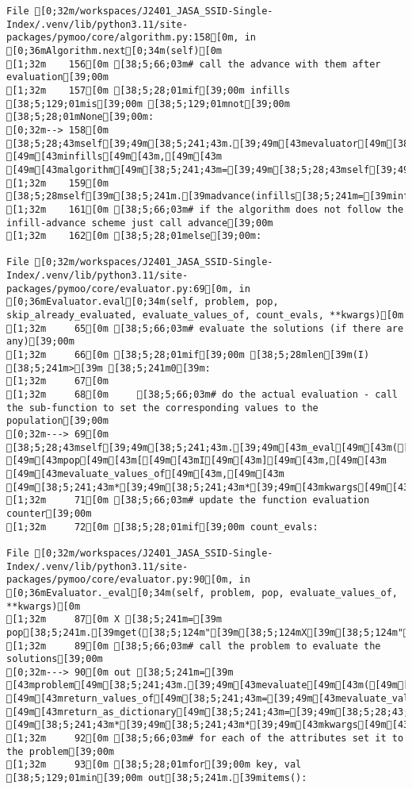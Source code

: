 \documentclass[
  letterpaper,
  DIV=11,
  numbers=noendperiod]{scrartcl}
\begin{document}
\begin{verbatim}
File [0;32m/workspaces/J2401_JASA_SSID-Single-Index/.venv/lib/python3.11/site-packages/pymoo/core/algorithm.py:158[0m, in [0;36mAlgorithm.next[0;34m(self)[0m
[1;32m    156[0m [38;5;66;03m# call the advance with them after evaluation[39;00m
[1;32m    157[0m [38;5;28;01mif[39;00m infills [38;5;129;01mis[39;00m [38;5;129;01mnot[39;00m [38;5;28;01mNone[39;00m:
[0;32m--> 158[0m     [38;5;28;43mself[39;49m[38;5;241;43m.[39;49m[43mevaluator[49m[38;5;241;43m.[39;49m[43meval[49m[43m([49m[38;5;28;43mself[39;49m[38;5;241;43m.[39;49m[43mproblem[49m[43m,[49m[43m [49m[43minfills[49m[43m,[49m[43m [49m[43malgorithm[49m[38;5;241;43m=[39;49m[38;5;28;43mself[39;49m[43m)[49m
[1;32m    159[0m     [38;5;28mself[39m[38;5;241m.[39madvance(infills[38;5;241m=[39minfills)
[1;32m    161[0m [38;5;66;03m# if the algorithm does not follow the infill-advance scheme just call advance[39;00m
[1;32m    162[0m [38;5;28;01melse[39;00m:

File [0;32m/workspaces/J2401_JASA_SSID-Single-Index/.venv/lib/python3.11/site-packages/pymoo/core/evaluator.py:69[0m, in [0;36mEvaluator.eval[0;34m(self, problem, pop, skip_already_evaluated, evaluate_values_of, count_evals, **kwargs)[0m
[1;32m     65[0m [38;5;66;03m# evaluate the solutions (if there are any)[39;00m
[1;32m     66[0m [38;5;28;01mif[39;00m [38;5;28mlen[39m(I) [38;5;241m>[39m [38;5;241m0[39m:
[1;32m     67[0m 
[1;32m     68[0m     [38;5;66;03m# do the actual evaluation - call the sub-function to set the corresponding values to the population[39;00m
[0;32m---> 69[0m     [38;5;28;43mself[39;49m[38;5;241;43m.[39;49m[43m_eval[49m[43m([49m[43mproblem[49m[43m,[49m[43m [49m[43mpop[49m[43m[[49m[43mI[49m[43m][49m[43m,[49m[43m [49m[43mevaluate_values_of[49m[43m,[49m[43m [49m[38;5;241;43m*[39;49m[38;5;241;43m*[39;49m[43mkwargs[49m[43m)[49m
[1;32m     71[0m [38;5;66;03m# update the function evaluation counter[39;00m
[1;32m     72[0m [38;5;28;01mif[39;00m count_evals:

File [0;32m/workspaces/J2401_JASA_SSID-Single-Index/.venv/lib/python3.11/site-packages/pymoo/core/evaluator.py:90[0m, in [0;36mEvaluator._eval[0;34m(self, problem, pop, evaluate_values_of, **kwargs)[0m
[1;32m     87[0m X [38;5;241m=[39m pop[38;5;241m.[39mget([38;5;124m"[39m[38;5;124mX[39m[38;5;124m"[39m)
[1;32m     89[0m [38;5;66;03m# call the problem to evaluate the solutions[39;00m
[0;32m---> 90[0m out [38;5;241m=[39m [43mproblem[49m[38;5;241;43m.[39;49m[43mevaluate[49m[43m([49m[43mX[49m[43m,[49m[43m [49m[43mreturn_values_of[49m[38;5;241;43m=[39;49m[43mevaluate_values_of[49m[43m,[49m[43m [49m[43mreturn_as_dictionary[49m[38;5;241;43m=[39;49m[38;5;28;43;01mTrue[39;49;00m[43m,[49m[43m [49m[38;5;241;43m*[39;49m[38;5;241;43m*[39;49m[43mkwargs[49m[43m)[49m
[1;32m     92[0m [38;5;66;03m# for each of the attributes set it to the problem[39;00m
[1;32m     93[0m [38;5;28;01mfor[39;00m key, val [38;5;129;01min[39;00m out[38;5;241m.[39mitems():


\end{verbatim}
\end{document}
